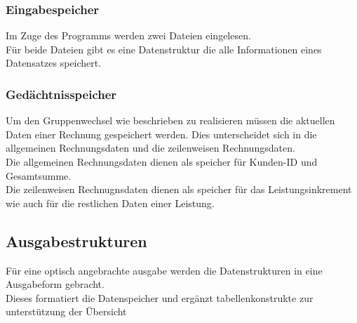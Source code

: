 \subsubsection{Eingabespeicher}\label{subsubsubsec:eingabespeicher}
Im Zuge des Programms werden zwei Dateien eingelesen.\\
Für beide Dateien gibt es eine Datenstruktur die alle Informationen eines Datensatzes speichert.\\

\subsubsection{Gedächtnisspeicher}\label{subsubsubsubsec:gedaechtnisspeicher}
Um den Gruppenwechsel wie beschrieben zu realisieren müssen die aktuellen Daten einer Rechnung gespeichert werden. Dies unterscheidet sich in die allgemeinen Rechnungsdaten und die zeilenweisen Rechnungsdaten.\\
Die allgemeinen Rechnungsdaten dienen als speicher für Kunden-ID und Gesamtsumme.\\
Die zeilenweisen Rechnugnsdaten dienen als speicher für das Leistungsinkrement wie auch für die restlichen Daten einer Leistung.\\

\subsection{Ausgabestrukturen}\label{subsubsec:ausgabestrukturen}
Für eine optisch angebrachte ausgabe werden die Datenstrukturen in eine Ausgabeform gebracht.\\ Dieses formatiert die Datenspeicher und ergänzt tabellenkonstrukte zur unterstützung der Übersicht 